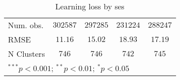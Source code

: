 \begin{table}
\begin{center}
\begin{tabular}{l c c c c}
Num. obs.                   & $302587$      & $297285$      & $231224$      & $288247$      \\
RMSE                        & $11.16$       & $15.02$       & $18.93$       & $17.19$       \\
N Clusters                  & $746$         & $746$         & $742$         & $745$         \\
\hline
\multicolumn{5}{l}{\scriptsize{$^{***}p<0.001$; $^{**}p<0.01$; $^{*}p<0.05$}}
\end{tabular}
\caption{Learning loss by ses}
\label{tableses}
\end{center}
\end{table}
